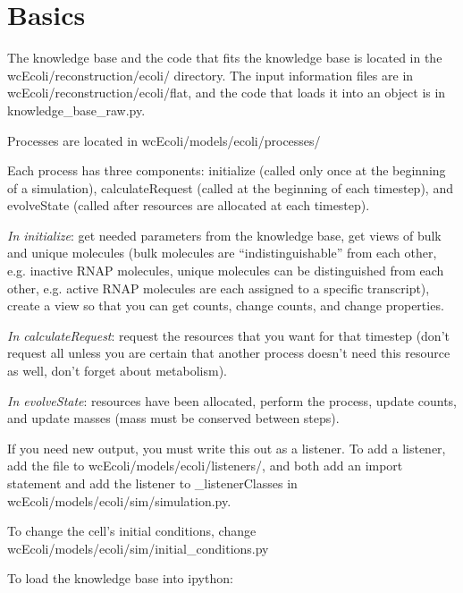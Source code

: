 \documentclass[12pt]{article}
\begin{document}
\maketitle

\section{Basics}

The knowledge base and the code that fits the knowledge base is located in the wcEcoli/reconstruction/ecoli/ directory. The input information files are in wcEcoli/reconstruction/ecoli/flat, and the code that loads it into an object is in knowledge\_base\_raw.py.
\par

Processes are located in wcEcoli/models/ecoli/processes/
\par
Each process has three components: initialize (called only once at the beginning of a simulation), calculateRequest (called at the beginning of each timestep), and evolveState (called after resources are allocated at each timestep).
\par
\emph{In initialize}: get needed parameters from the knowledge base, get views of bulk and unique molecules (bulk molecules are “indistinguishable” from each other, e.g. inactive RNAP molecules, unique molecules can be distinguished from each other, e.g. active RNAP molecules are each assigned to a specific transcript), create a view so that you can get counts, change counts, and change properties.
\par
\emph{In calculateRequest}: request the resources that you want for that timestep (don’t request all unless you are certain that another process doesn’t need this resource as well, don’t forget about metabolism).
\par
\emph{In evolveState}: resources have been allocated, perform the process, update counts, and update masses (mass must be conserved between steps).
\par
If you need new output, you must write this out as a listener. To add a listener, add the file to wcEcoli/models/ecoli/listeners/, and both add an import statement and add the listener to \_listenerClasses in wcEcoli/models/ecoli/sim/simulation.py.
\par
To change the cell’s initial conditions, change wcEcoli/models/ecoli/sim/initial\_conditions.py
\par
To load the knowledge base into ipython:
\par
\end{document}
